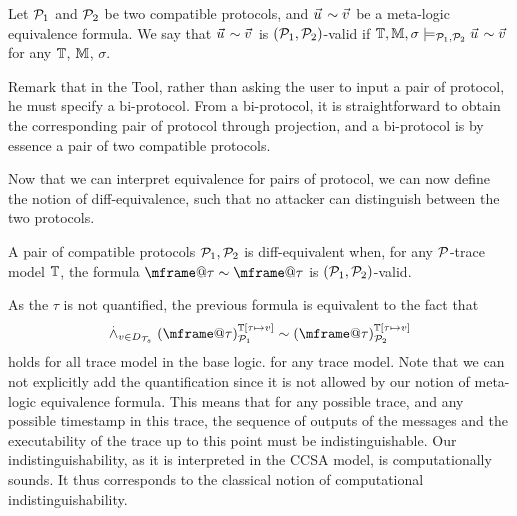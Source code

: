 \begin{definition}
  Let $\mathcal{P}_1$ and $\mathcal{P}_2$ be two compatible protocols, and
  $\pvec{u} \sim \pvec{v}$ be a meta-logic equivalence formula. 
 We say that $\pvec{u} \sim \pvec{v}$ is $(\mathcal{P}_1,\mathcal{P}_2)$-valid if $\TM, \Mo, \sigma \models_{\calp_1,\calp_2} \pvec{u} \sim \pvec{v}$ for any $\mathbb{T}$, $\mathbb{M}$, $\sigma$.
\end{definition}


Remark that in the Tool, rather than asking the user to input a pair of protocol, he must specify a bi-protocol. From a bi-protocol, it is straightforward to obtain the corresponding pair of protocol through projection, and a bi-protocol is by essence a pair of two compatible protocols.


Now that we can interpret equivalence for pairs of protocol, we can now define the notion of diff-equivalence, such that no attacker can distinguish between the two protocols.

\begin{definition}
  \label{def:process-equiv}
  A pair of compatible protocols $\mathcal{P}_1,\mathcal{P}_2$ is diff-equivalent when,
  for any $\mathcal{P}$-trace model $\mathbb{T}$, the formula $\mframe@\tau  \sim \mframe@\tau$ is $(\mathcal{P}_1,\mathcal{P}_2)$-valid.
\end{definition}

As the $\tau$ is not quantified, the previous formula is equivalent to the fact that \[
    \dand_{v\in D_\XT}
    \interp{\mframe@\tau}{\TM[\tau\mapsto v]}{\calp_1}
    \sim
    \interp{\mframe@\tau}{\TM[\tau \mapsto v]}{\calp_2}
  \]
  holds for all trace model in the base logic.  for any trace model.  Note that
  we can not explicitly add the quantification since it is not allowed by our
  notion of meta-logic equivalence formula.  This means that for any possible
  trace, and any possible timestamp in this trace, the sequence of outputs of
  the messages and the executability of the trace up to this point must be
  indistinguishable. Our indistinguishability, as it is interpreted in the CCSA
  model, is computationally sounds. It thus corresponds to the classical notion
  of computational indistinguishability.

